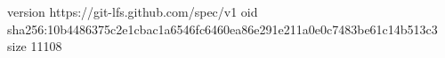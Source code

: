 version https://git-lfs.github.com/spec/v1
oid sha256:10b4486375c2e1cbac1a6546fc6460ea86e291e211a0e0c7483be61c14b513c3
size 11108
